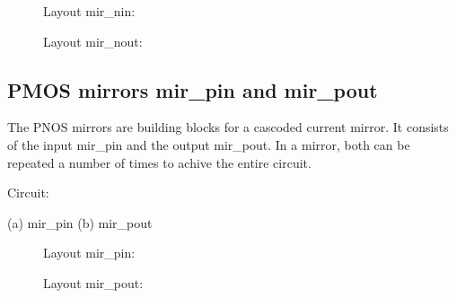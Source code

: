 \begin{figure}[h]
Layout mir\_nin:\\

\centerline{}
\vspace{1cm}
Layout mir\_nout:\\

\centerline{}
\end{figure}
\clearpage

\subsection {PMOS mirrors mir\_pin and mir\_pout}
The PNOS mirrors are building blocks for a cascoded current mirror.
It consists of the input mir\_pin and the output mir\_pout.
In a mirror, both can be repeated a number of times to achive the
entire circuit.

Circuit:\\
\medskip
\begin{figure}[h]
\centerline{}
\end{figure}
(a) mir\_pin (b) mir\_pout
\newpage
\begin{figure}[h]
Layout mir\_pin:\\

\centerline{}
\vspace{1cm}
Layout mir\_pout:\\

\centerline{}
\end{figure}

\clearpage
